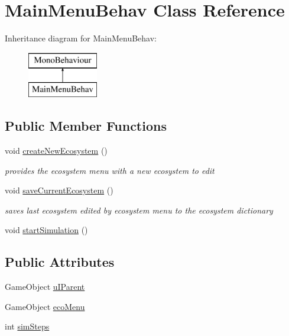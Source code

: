 \hypertarget{class_main_menu_behav}{}\section{Main\+Menu\+Behav Class Reference}
\label{class_main_menu_behav}
Inheritance diagram for Main\+Menu\+Behav\+:\begin{figure}[H]
\begin{center}
\leavevmode
\includegraphics[height=2.000000cm]{class_main_menu_behav}
\end{center}
\end{figure}
\subsection*{Public Member Functions}
\begin{DoxyCompactItemize}
\item 
void \mbox{\hyperlink{class_main_menu_behav_ae23e7f61fb7c6affea630307fac58f92}{create\+New\+Ecosystem}} ()
\begin{DoxyCompactList}\small\item\em provides the ecosystem menu with a new ecosystem to edit \end{DoxyCompactList}\item 
void \mbox{\hyperlink{class_main_menu_behav_ac17fe569792552206ddae7d65d66ced3}{save\+Current\+Ecosystem}} ()
\begin{DoxyCompactList}\small\item\em saves last ecosystem edited by ecosystem menu to the ecosystem dictionary \end{DoxyCompactList}\item 
void \mbox{\hyperlink{class_main_menu_behav_a9d999e202894ebe1df82a88e677cc45e}{start\+Simulation}} ()
\end{DoxyCompactItemize}
\subsection*{Public Attributes}
\begin{DoxyCompactItemize}
\item 
Game\+Object \mbox{\hyperlink{class_main_menu_behav_a74da9f8edb36612d2587f00006db89e8}{u\+I\+Parent}}
\item 
Game\+Object \mbox{\hyperlink{class_main_menu_behav_af762eecb3eeea9808e64e35758efdca9}{eco\+Menu}}
\item 
int \mbox{\hyperlink{class_main_menu_behav_a6b087cc95f494547d1f0e04a5c045531}{sim\+Steps}}
\end{DoxyCompactItemize}


